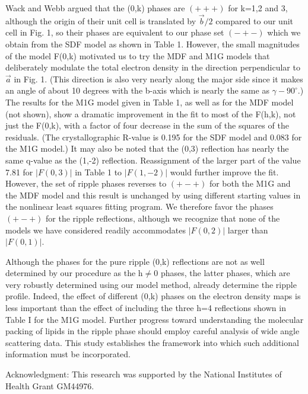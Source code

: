 Wack and Webb \cite{Wac89a} argued that the (0,k) phases are $(+++)$ for 
k=1,2 and 3,
although the origin of their unit cell is translated by $\vec{b}/2$
compared to our unit cell in Fig. 1, so their
phases are equivalent to our phase set $(-+-)$ which we obtain
from the SDF model as shown in Table 1.  However, the small magnitudes
of the model F(0,k) motivated us to try the MDF and M1G models that
deliberately modulate the total electron density in the direction 
perpendicular to $\vec{a}$ in Fig. 1.  (This direction is also very nearly
along the major side since it makes an angle of about 10 degrees
with the b-axis which is nearly the same as $\gamma - 90^{\circ}$.)
The results for the M1G model given in Table 1, as well as for
the MDF model (not shown), show a dramatic
improvement in the fit to most of the F(h,k), not just the F(0,k), with
a factor of four decrease in the sum of the squares of the residuals.
(The crystallographic R-value is 0.195 for the SDF model and 
0.083 for the M1G model.)  It may also be noted that the (0,3) reflection 
has nearly the same q-value as the (1,-2) reflection.  Reassignment of the 
larger part of the value 7.81 for $|F(0,3)|$ in Table 1 to $|F(1,-2)|$ would
further improve the fit.
However, the set of ripple phases reverses to $(+-+)$ for both the M1G and
the MDF model and this result is
unchanged by using different starting values in the nonlinear
least squares fitting program.   We therefore favor the phases $(+-+)$
for the ripple reflections, although we recognize that none of
the models we have considered readily accommodates $|F(0,2)|$ larger
than $|F(0,1)|$.

Although the phases for the pure ripple (0,k) reflections
are not as well determined by our procedure as the h$\neq$0 phases,
the latter phases, which are very robustly determined using
our model method, already determine the ripple profile.  
Indeed, the effect of different (0,k) phases on the electron density
maps is less important than the effect of including the three h=4 
reflections shown in Table I for the M1G model.
Further progress toward understanding the molecular packing of lipids in the 
ripple phase should employ careful analysis of wide angle scattering data.
This study establishes the framework into which such additional information
must be incorporated.

\vspace{0.1in}
\small
Acknowledgment: This research was supported by the National Institutes 
of Health Grant GM44976.

